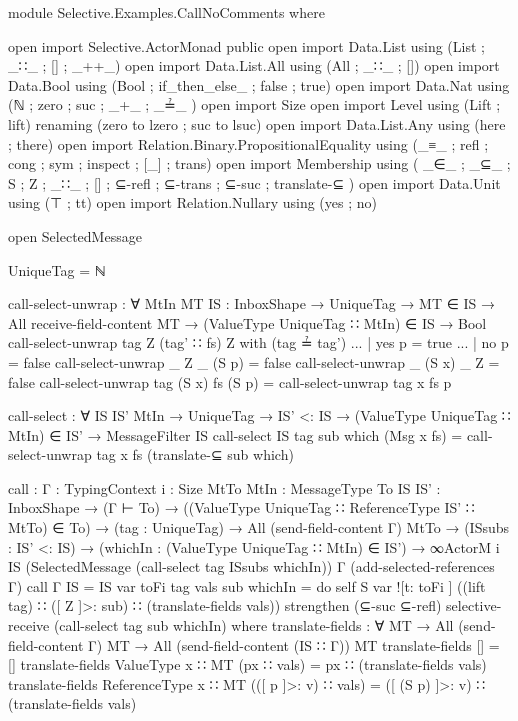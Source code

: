 \begin{code}
module Selective.Examples.CallNoComments where

open import Selective.ActorMonad public
open import Data.List using (List ; _∷_ ; [] ; _++_)
open import Data.List.All using (All ; _∷_ ; [])
open import Data.Bool using (Bool ; if_then_else_ ; false ; true)
open import Data.Nat using (ℕ ; zero ; suc ; _+_ ; _≟_ )
open import Size
open import Level using (Lift ; lift) renaming (zero to lzero ; suc to lsuc)
open import Data.List.Any using (here ; there)
open import Relation.Binary.PropositionalEquality
            using (_≡_ ; refl ; cong ; sym ; inspect ; [_] ; trans)
open import Membership using (
              _∈_ ; _⊆_ ; S ; Z ; _∷_ ; []
              ; ⊆-refl ; ⊆-trans ; ⊆-suc ; translate-⊆
              )
open import Data.Unit using (⊤ ; tt)
open import Relation.Nullary using (yes ; no)

open SelectedMessage

UniqueTag = ℕ

call-select-unwrap : ∀ {MtIn MT} {IS : InboxShape} →
                       UniqueTag →
                       MT ∈ IS →
                       All receive-field-content MT →
                       (ValueType UniqueTag ∷ MtIn) ∈ IS →
                       Bool
call-select-unwrap tag Z (tag' ∷ fs) Z with (tag ≟ tag')
... | yes p = true
... | no p = false
call-select-unwrap _ Z _ (S p) = false
call-select-unwrap _ (S x) _ Z = false
call-select-unwrap tag (S x) fs (S p) = call-select-unwrap tag x fs p

call-select : ∀ {IS IS' MtIn} →
                UniqueTag →
                IS' <: IS →
                (ValueType UniqueTag ∷ MtIn) ∈ IS' →
                MessageFilter IS
call-select {IS} tag sub which (Msg x fs) =
  call-select-unwrap tag x fs (translate-⊆  sub which)

call : {Γ : TypingContext} {i : Size}
       {MtTo MtIn : MessageType}
       {To IS IS' : InboxShape} →
       (Γ ⊢ To) →
       ((ValueType UniqueTag ∷ ReferenceType IS' ∷ MtTo) ∈ To) →  
       (tag : UniqueTag) →
       All (send-field-content Γ) MtTo →
       (ISsubs : IS' <: IS) →
       (whichIn : (ValueType UniqueTag ∷ MtIn) ∈ IS') →
       ∞ActorM i IS
         (SelectedMessage (call-select tag ISsubs whichIn))
         Γ (add-selected-references Γ)
call {Γ} {IS = IS} var toFi tag vals sub whichIn =
  do
     self
     S var ![t: toFi ] ((lift tag) ∷ ([ Z ]>: sub) ∷ (translate-fields vals))
     strengthen (⊆-suc ⊆-refl)
     selective-receive (call-select tag sub whichIn)
  where
    translate-fields : ∀ {MT} →
                       All (send-field-content Γ) MT →
                       All (send-field-content (IS ∷ Γ)) MT
    translate-fields [] = []
    translate-fields {ValueType x ∷ MT} (px ∷ vals) =
      px ∷ (translate-fields vals)
    translate-fields {ReferenceType x ∷ MT} (([ p ]>: v) ∷ vals) =
      ([ (S p) ]>: v) ∷ (translate-fields vals)


\end{code}
